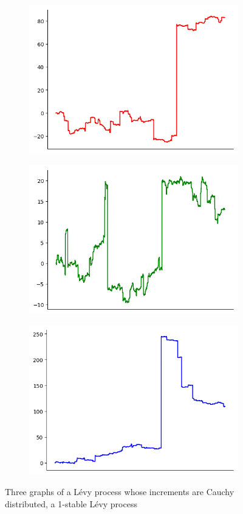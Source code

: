 \begin{figure}[htbp]
	\centering
	\begin{subfigure}{0.3\textwidth}
		\centering
		\includegraphics[width=0.85\linewidth]{pics/ch-brownian/1-cauchyr.png}
	\end{subfigure}%
	\begin{subfigure}{.3\textwidth}
		\centering
		\includegraphics[width=.9\linewidth]{pics/ch-brownian/1-cauchyg.png}
	\end{subfigure}%
	\begin{subfigure}{.3\textwidth}
		\centering
		\includegraphics[width=.9\linewidth]{pics/ch-brownian/1-cauchyb.png}
	\end{subfigure}
	\caption{Three graphs of a L\'evy process whose increments are Cauchy distributed, a 1-stable L\'evy process}
	\label{fig:cauchy}
\end{figure}

